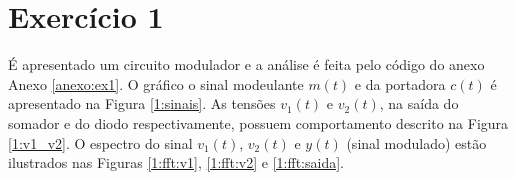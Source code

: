 \documentclass[a4paper,12pt,oneside,openany,table,xcdraw]{article}
\begin{document}
\newcommand{\thedepartment}{Faculdade de Engenharia Elétrica}
\newcommand{\thecourse}{FEELT}
\newcommand{\thetitle}{Resolução da Lista de Exercícios 2}
\newcommand{\thetype}{Trabalho de Princípios de Comunição}
\newcommand{\theproftitle}{Bacharel em Engenharia Elétrica}
\newcommand{\thestudent}{Lesly Viviane Montúfar Berrios\\
\centering11811ETE001}
\newcommand{\theadvisor}{Prof. Lorenço Santos Vasconcelos}
\newcommand{\thecity}{Uberlândia}

\thispagestyle{empty}



\onehalfspacing
\tableofcontents %
\newpage

\section{Exercício 1}
É apresentado um circuito modulador e a análise é feita pelo código do anexo Anexo \ref{anexo:ex1}. O gráfico o sinal modeulante $m(t)$ e da portadora $c(t)$ é apresentado na Figura \ref{1:sinais}. As tensões $v_1(t)$ e $v_2(t)$, na saída do somador e do diodo respectivamente, possuem comportamento descrito na Figura \ref{1:v1_v2}. O espectro do sinal $v_1(t)$, $v_2(t)$ e $y(t)$ (sinal modulado) estão ilustrados nas Figuras \ref{1:fft:v1}, \ref{1:fft:v2} e \ref{1:fft:saida}.
\end{document}
